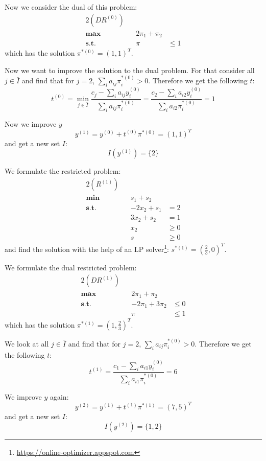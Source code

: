 \documentclass[a4paper,12pt,headsepline]{scrartcl}
\begin{document}
Now we consider the dual of this problem:
\begin{alignat*}{2}
	(DR^{(0)}) \\
	\textbf{max}\quad  && 2\pi_1 + \pi_2 \\
	\textbf{s.t.}\quad && \pi &\le 1
\end{alignat*}
which has the solution $\pi^{*(0)} = (1,1)^T$.

Now we want to improve the solution to the dual problem.
For that consider all $j\in\bar{I}$ and find that for $j=2$, $\sum_i a_{ij}\pi_i^{*(0)} > 0$.
Therefore we get the following $t$:
\[ t^{(0)} = \min_{j\in\bar{I}} \frac{c_j-\sum_i a_{ij}y_i^{(0)}}{\sum_i a_{ij}\pi_i^{*(0)}} = \frac{c_2-\sum_i a_{i2}y_i^{(0)}}{\sum_i a_{i2}\pi_i^{*(0)}} = 1 \]

Now we improve $y$
\[ y^{(1)} = y^{(0)} + t^{(0)}\pi^{*(0)} = (1,1)^T \]
and get a new set $I$:
\[ I\left(y^{(1)}\right) = \{2\} \]

We formulate the restricted problem:
\begin{alignat*}{2}
	(R^{(1)}) \\
	\textbf{min}\quad  && s_1 + s_2 \\
	\textbf{s.t.}\quad && -2x_2 + s_1 &= 2 \\
										 && 3x_2 + s_2 &= 1 \\
										 && x_2 &\ge 0 \\
								     && s &\ge 0
\end{alignat*}
and find the solution with the help of an LP solver\footnote{\url{https://online-optimizer.appspot.com}}: $s^{*(1)} = (\frac{2}{3},0)^T$.

We formulate the dual restricted problem:
\begin{alignat*}{2}
	(DR^{(1)}) \\
	\textbf{max}\quad  && 2\pi_1 + \pi_2 \\
	\textbf{s.t.}\quad && -2\pi_1 + 3\pi_2 &\le 0 \\
										 && \pi &\le 1
\end{alignat*}
which has the solution $\pi^{*(1)} = (1,\frac{2}{3})^T$.

We look at all $j\in\bar{I}$ and find that for $j=2$, $\sum_i a_{ij}\pi_i^{*(0)} > 0$.
Therefore we get the following $t$:
\[ t^{(1)} = \frac{c_1-\sum_i a_{i1}y_i^{(0)}}{\sum_i a_{i1}\pi_i^{*(0)}} = 6 \]

We improve $y$ again:
\[ y^{(2)} = y^{(1)} + t^{(1)}\pi^{*(1)} = (7,5)^T \]
and get a new set $I$:
\[ I\left(y^{(2)}\right) = \{1,2\} \]
\end{document}
